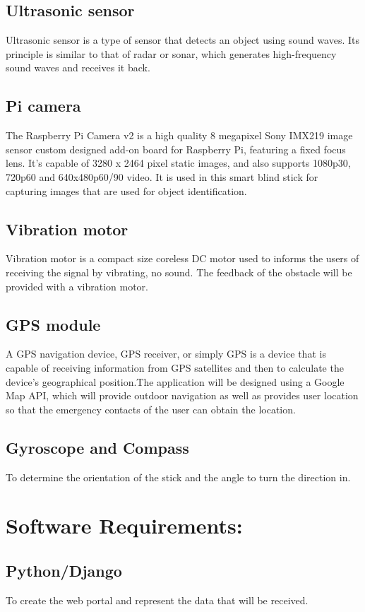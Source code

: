 \subsection{Ultrasonic sensor}
Ultrasonic sensor is a type of sensor that detects an object using sound waves. Its principle is similar to that of radar or sonar, which generates high-frequency sound waves and receives it back.

\subsection{Pi camera}
The Raspberry Pi Camera v2 is a high quality 8 megapixel Sony IMX219 image sensor custom designed add-on board for Raspberry Pi, featuring a fixed focus lens. It's capable of 3280 x 2464 pixel static images, and also supports 1080p30, 720p60 and 640x480p60/90 video. It is used in this smart blind stick for capturing images that are used for object identification. 

\subsection{Vibration motor}
Vibration motor is a compact size coreless DC motor used to informs the users of receiving the signal by vibrating, no sound. The feedback of the obstacle will be provided with a vibration motor.

\subsection{GPS module}
A GPS navigation device, GPS receiver, or simply GPS is a device that is capable of receiving information from GPS satellites and then to calculate the device's geographical position.The application will be designed using a Google Map API, which will provide outdoor navigation as well as provides user location so that the emergency contacts of the user can obtain the location.

\subsection{Gyroscope and Compass}
To determine the orientation of the stick and the angle to turn the direction in.

\section{Software Requirements:}
\subsection
{Python/Django}To create the web portal and represent the data that will be received.

